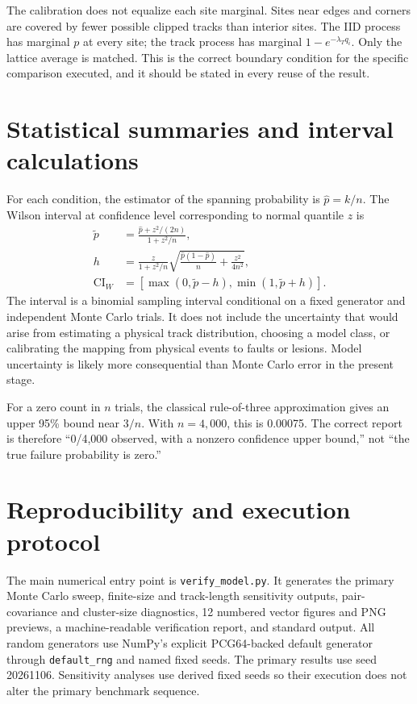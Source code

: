 \documentclass[11pt,a4paper,oneside]{article}
\begin{document}
The calibration does not equalize each site marginal. Sites near edges and corners are covered by fewer possible clipped tracks than interior sites. The IID process has marginal \(p\) at every site; the track process has marginal \(1-e^{-\lambda_Tq_i}\). Only the lattice average is matched. This is the correct boundary condition for the specific comparison executed, and it should be stated in every reuse of the result.

\section{Statistical summaries and interval calculations}
For each condition, the estimator of the spanning probability is \(\hat p=k/n\). The Wilson interval at confidence level corresponding to normal quantile \(z\) is
\begin{align}
\tilde p&=\frac{\hat p+z^2/(2n)}{1+z^2/n},\\
 h&=\frac{z}{1+z^2/n}\sqrt{\frac{\hat p(1-\hat p)}{n}+\frac{z^2}{4n^2}},\\
 \mathrm{CI}_{W}&=[\max(0,\tilde p-h),\min(1,\tilde p+h)].
\end{align}
The interval is a binomial sampling interval conditional on a fixed generator and independent Monte Carlo trials. It does not include the uncertainty that would arise from estimating a physical track distribution, choosing a model class, or calibrating the mapping from physical events to faults or lesions. Model uncertainty is likely more consequential than Monte Carlo error in the present stage.

For a zero count in \(n\) trials, the classical rule-of-three approximation gives an upper 95\% bound near \(3/n\). With \(n=4,000\), this is 0.00075. The correct report is therefore ``0/4,000 observed, with a nonzero confidence upper bound,'' not ``the true failure probability is zero.''

\section{Reproducibility and execution protocol}
The main numerical entry point is \texttt{verify\_model.py}. It generates the primary Monte Carlo sweep, finite-size and track-length sensitivity outputs, pair-covariance and cluster-size diagnostics, 12 numbered vector figures and PNG previews, a machine-readable verification report, and standard output. All random generators use NumPy's explicit PCG64-backed default generator through \texttt{default\_rng} and named fixed seeds. The primary results use seed 20261106. Sensitivity analyses use derived fixed seeds so their execution does not alter the primary benchmark sequence.
\end{document}
